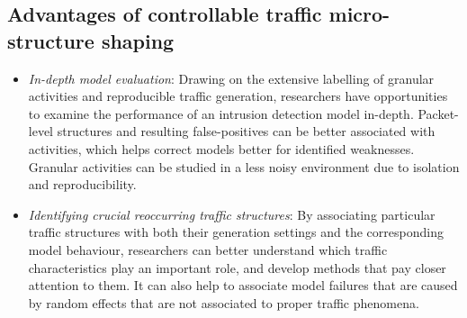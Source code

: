 \documentclass[conference]{IEEEtran}
\begin{document}
\subsection*{Advantages of controllable traffic micro-structure shaping}%


\begin{itemize}

\item \textit{In-depth model evaluation}:
Drawing on the extensive labelling of granular activities and reproducible traffic generation, researchers have opportunities to examine the performance of an intrusion detection model in-depth. 
Packet-level structures and resulting false-positives can be better associated with activities, which helps correct models better for identified weaknesses. Granular activities can be studied in a less noisy environment due to isolation and reproducibility. 



\item \textit{Identifying crucial reoccurring traffic structures}: By associating particular traffic structures with both their generation settings and the corresponding model behaviour, researchers can better understand which traffic characteristics play an important role, and develop methods that pay closer attention to them. It can also help to associate model failures that are caused by random effects that are not associated to proper traffic phenomena.





\end{itemize}
\end{document}
